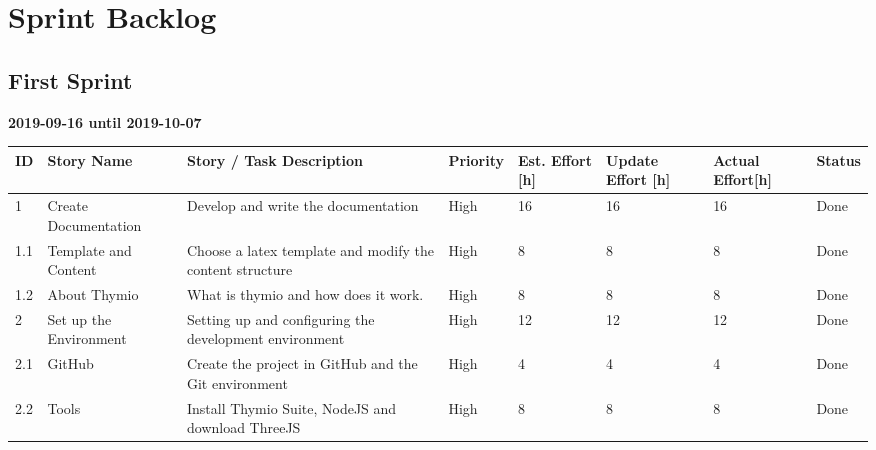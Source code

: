 \documentclass{scrbook}
\begin{document}
\chapter{Sprint Backlog}
\section{First Sprint}
\textbf{2019-09-16 until 2019-10-07}
\begin{longtable}{p{5mm}|p{2cm}|p{4cm}|p{1cm}|p{1cm}|p{1cm}|p{1cm}|p{15mm}}
  ID                     & Story Name & Story / Task Description & Priority & Est. Effort {[}h{]} & Update Effort {[}h{]} & Actual Effort{[}h{]} & Status                \\ \hline
  1 & Create Documentation & Develop and write the documentation & High & 16 & 16 & 16 & Done \\ 
  1.1 & Template and Content & Choose a latex template and modify the content structure & High & 8 & 8 & 8 & Done \\ 
  1.2 & About Thymio & What is thymio and how does it work. & High & 8 & 8 & 8 & Done \\ 
  2 & Set up the Environment & Setting up and configuring the development environment & High & 12 & 12 & 12 & Done \\ 
  2.1 & GitHub & Create the project in GitHub and the Git environment & High & 4 & 4 & 4 & Done \\ 
  2.2 & Tools & Install Thymio Suite, NodeJS and download ThreeJS & High & 8 & 8 & 8 & Done \\ 
\end{longtable}
\end{document}
